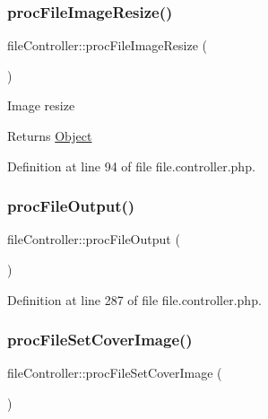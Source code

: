 \subsubsection{\texorpdfstring{proc\+File\+Image\+Resize()}{procFileImageResize()}}
{\footnotesize\ttfamily file\+Controller\+::proc\+File\+Image\+Resize (\begin{DoxyParamCaption}{ }\end{DoxyParamCaption})}

Image resize

\begin{DoxyReturn}{Returns}
\hyperlink{classObject}{Object} 
\end{DoxyReturn}


Definition at line 94 of file file.\+controller.\+php.

\hypertarget{classfileController_a21d4fb5d44f6f078cc9d63b89e642dce}{}\label{classfileController_a21d4fb5d44f6f078cc9d63b89e642dce} 
\subsubsection{\texorpdfstring{proc\+File\+Output()}{procFileOutput()}}
{\footnotesize\ttfamily file\+Controller\+::proc\+File\+Output (\begin{DoxyParamCaption}{ }\end{DoxyParamCaption})}



Definition at line 287 of file file.\+controller.\+php.

\hypertarget{classfileController_a54e65e695efa22b2a9507fd52e44d601}{}\label{classfileController_a54e65e695efa22b2a9507fd52e44d601} 
\subsubsection{\texorpdfstring{proc\+File\+Set\+Cover\+Image()}{procFileSetCoverImage()}}
{\footnotesize\ttfamily file\+Controller\+::proc\+File\+Set\+Cover\+Image (\begin{DoxyParamCaption}{ }\end{DoxyParamCaption})}



